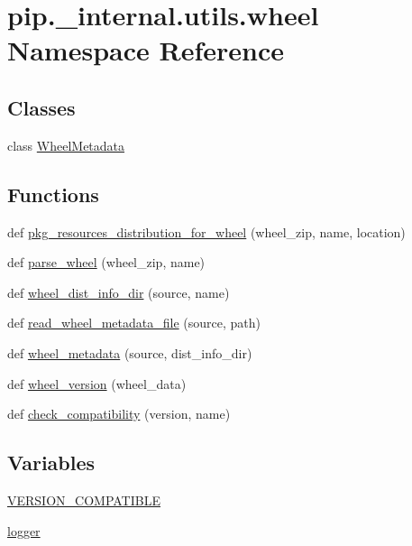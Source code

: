 \hypertarget{namespacepip_1_1__internal_1_1utils_1_1wheel}{}\section{pip.\+\_\+internal.\+utils.\+wheel Namespace Reference}
\label{namespacepip_1_1__internal_1_1utils_1_1wheel}
\subsection*{Classes}
\begin{DoxyCompactItemize}
\item 
class \hyperlink{classpip_1_1__internal_1_1utils_1_1wheel_1_1WheelMetadata}{Wheel\+Metadata}
\end{DoxyCompactItemize}
\subsection*{Functions}
\begin{DoxyCompactItemize}
\item 
def \hyperlink{namespacepip_1_1__internal_1_1utils_1_1wheel_af34bfda22bc345e6ba61a4f98354ae46}{pkg\+\_\+resources\+\_\+distribution\+\_\+for\+\_\+wheel} (wheel\+\_\+zip, name, location)
\item 
def \hyperlink{namespacepip_1_1__internal_1_1utils_1_1wheel_a5694f73c60d36a304f5b667b0c543f4b}{parse\+\_\+wheel} (wheel\+\_\+zip, name)
\item 
def \hyperlink{namespacepip_1_1__internal_1_1utils_1_1wheel_a6236368c0d4b0921172e561d40294582}{wheel\+\_\+dist\+\_\+info\+\_\+dir} (source, name)
\item 
def \hyperlink{namespacepip_1_1__internal_1_1utils_1_1wheel_ad8755183e1435a2e60d8877a3c29f0c5}{read\+\_\+wheel\+\_\+metadata\+\_\+file} (source, path)
\item 
def \hyperlink{namespacepip_1_1__internal_1_1utils_1_1wheel_a37434d5e8d89e95220dba4bffd2fc26e}{wheel\+\_\+metadata} (source, dist\+\_\+info\+\_\+dir)
\item 
def \hyperlink{namespacepip_1_1__internal_1_1utils_1_1wheel_a02571c19fd5d5c97d95501b8c9fb7efd}{wheel\+\_\+version} (wheel\+\_\+data)
\item 
def \hyperlink{namespacepip_1_1__internal_1_1utils_1_1wheel_a2457b15ce9df17fc6fce59acf362bde7}{check\+\_\+compatibility} (version, name)
\end{DoxyCompactItemize}
\subsection*{Variables}
\begin{DoxyCompactItemize}
\item 
\hyperlink{namespacepip_1_1__internal_1_1utils_1_1wheel_ac9c317eb412c9c17f22e88e2726aa01e}{V\+E\+R\+S\+I\+O\+N\+\_\+\+C\+O\+M\+P\+A\+T\+I\+B\+LE}
\item 
\hyperlink{namespacepip_1_1__internal_1_1utils_1_1wheel_a49313abd1b63749673f663b04ef48d20}{logger}
\end{DoxyCompactItemize}


